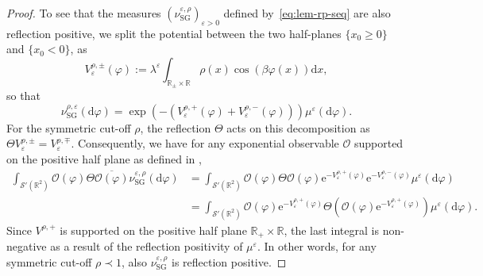 \documentclass[11pt, a4paper]{scrartcl}
\numberwithin{equation}{section}
\theoremstyle{plain}
\theoremstyle{remark}
\newcommand{\assign}{:=}
\newcommand{\mathd}{\mathrm{d}}
\newcommand{\mathe}{\mathrm{e}}
\newcommand{\tmop}[1]{\ensuremath{\operatorname{#1}}}
\newcommand{\tmtextbf}[1]{\text{{\bfseries{#1}}}}
\begin{document}
\begin{proof}
	To see that the measures $(\nu_{\tmop{SG}}^{\varepsilon,
			\rho})_{\varepsilon > 0}$ defined by~\eqref{eq:lem-rp-seq} are also
	reflection positive, we split the potential between the two half-planes $\{
		x_0 \geqslant 0 \}$ and $\{ x_0 < 0 \}$, as
	\[ V_{\varepsilon}^{\rho, \pm} (\varphi) \assign \lambda^{\varepsilon}
		\int_{\mathbb{R}_{\pm} \times \mathbb{R}} \rho (x) \cos (\beta \varphi
			(x)) \mathd x, \]
	so that
	\[ \nu_{\tmop{SG}}^{\rho, \varepsilon} (\mathd \varphi) = \exp (-
		(V_{\varepsilon}^{\rho, +} (\varphi) + V_{\varepsilon}^{\rho, -}
		(\varphi))) \mu^{\varepsilon} (\mathd \varphi) . \]
	For the symmetric cut-off $\rho$, the reflection $\Theta$ acts on this
	decomposition as $\Theta V_{\varepsilon}^{\rho, \pm} =
		V_{\varepsilon}^{\rho, \mp}$. Consequently, we have for any exponential
	observable $\mathcal{O}$ supported on the positive half plane as defined in
	\tmtextbf{(OS3)},
	\[ \begin{aligned}
			\int_{\mathcal{S}' (\mathbb{R}^2)} \mathcal{O} (\varphi) \Theta
			\overline{\mathcal{O} (\varphi)} \nu_{\tmop{SG}}^{\varepsilon, \rho}
			(\mathd \varphi) & = \int_{\mathcal{S}' (\mathbb{R}^2)} \mathcal{O}
			(\varphi) \Theta \mathcal{O} (\varphi) \mathe^{- V_{\varepsilon}^{\rho,
						+} (\varphi)} \mathe^{- V_{\varepsilon}^{\rho, -} (\varphi)}
			\mu^{\varepsilon} (\mathd \varphi)                                            \\
			                 & = \int_{\mathcal{S}' (\mathbb{R}^2)} \mathcal{O} (\varphi)
			\mathe^{- V_{\varepsilon}^{\rho, +} (\varphi)} \Theta (\mathcal{O}
				(\varphi) \mathe^{- V_{\varepsilon}^{\rho, +} (\varphi)})
			\mu^{\varepsilon} (\mathd \varphi) .
		\end{aligned} \]
	Since $V^{\rho, +}$ is supported on the positive half plane $\mathbb{R}_+
		\times \mathbb{R}$, the last integral is non-negative as a result of the
	reflection positivity of $\mu^{\varepsilon}$. In other words, for any
	symmetric cut-off $\rho \prec 1$, also $\nu_{\tmop{SG}}^{\varepsilon, \rho}$ is
	reflection positive.
\end{proof}
\end{document}
